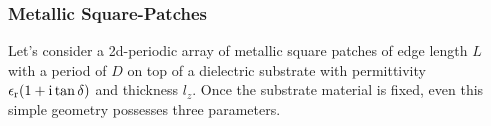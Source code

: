 \subsubsection{Metallic Square-Patches}
Let's consider a 2d-periodic array of metallic square patches of edge length $L$ with a period of $D$ on top of a dielectric substrate with permittivity $\epsilon_\mathrm{r}(1+\mathrm{i} \tan\delta)$ and thickness $l_z$. Once the substrate material is fixed, even this simple geometry possesses three parameters.

